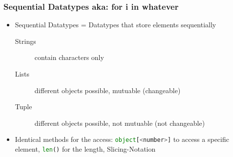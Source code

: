\documentclass[english]{beamer}
\begin{document}
\begin{frame}
\frametitle{Sequential Datatypes aka: for i in whatever}

\begin{itemize}
\item Sequential Datatypes = Datatypes that store elements sequentially

\begin{description}
\item[Strings] contain characters only
\item[Lists] different objects possible, mutuable (changeable)
\item[Tuple] different objects possible, not mutuable \newline (not changeable)
\end{description}
\item Identical methods for the access: \lstinline[language={Python}]{object[<number>]} to access a specific element, \lstinline[language={Python}]{len()} for the length, Slicing-Notation
\end{itemize}
\end{frame}

%
%
%
%
%
%
\end{document}

